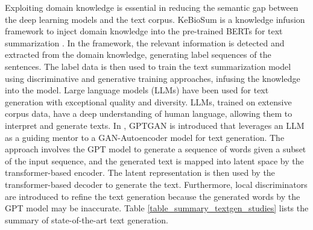 \documentclass[preprint,12pt]{elsarticle}
\begin{document}
Exploiting domain knowledge is essential in reducing the semantic gap between the deep learning models and the text corpus. KeBioSum is a knowledge infusion framework to inject domain knowledge into the pre-trained BERTs for text summarization \citep{xie_pre-trained_2022}. In the framework, the relevant information is detected and extracted from the domain knowledge, generating label sequences of the sentences. The label data is then used to train the text summarization model using discriminative and generative training approaches, infusing the knowledge into the model. Large language models (LLMs) have been used for text generation with exceptional quality and diversity. LLMs, trained on extensive corpus data, have a deep understanding of human language, allowing them to interpret and generate texts. In \citep{hajipoor_gptgan_2025}, GPTGAN is introduced that leverages an LLM as a guiding mentor to a GAN-Autoencoder model for text generation. The approach involves the GPT model to generate a sequence of words given a subset of the input sequence, and the generated text is mapped into latent space by the transformer-based encoder. The latent representation is then used by the transformer-based decoder to generate the text. Furthermore, local discriminators are introduced to refine the text generation because the generated words by the GPT model may be inaccurate. Table \ref{table_summary_textgen_studies} lists the summary of state-of-the-art text generation.
\end{document}

